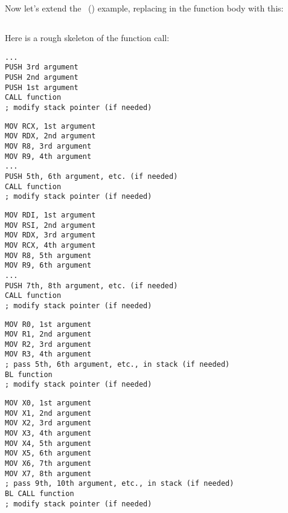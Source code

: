 \section{\PrintfSeveralArgumentsSectionName}

Now let's extend the \IT{\HelloWorldSectionName}~() example, replacing \printf in
the \main function body with this:







\subsection{\Conclusion{}}

Here is a rough skeleton of the function call:

\begin{lstlisting}[caption=x86]
...
PUSH 3rd argument
PUSH 2nd argument
PUSH 1st argument
CALL function
; modify stack pointer (if needed)
\end{lstlisting}

\begin{lstlisting}[caption=x64 (MSVC)]
MOV RCX, 1st argument
MOV RDX, 2nd argument
MOV R8, 3rd argument
MOV R9, 4th argument
...
PUSH 5th, 6th argument, etc. (if needed)
CALL function
; modify stack pointer (if needed)
\end{lstlisting}

\begin{lstlisting}[caption=x64 (GCC)]
MOV RDI, 1st argument
MOV RSI, 2nd argument
MOV RDX, 3rd argument
MOV RCX, 4th argument
MOV R8, 5th argument
MOV R9, 6th argument
...
PUSH 7th, 8th argument, etc. (if needed)
CALL function
; modify stack pointer (if needed)
\end{lstlisting}

\begin{lstlisting}[caption=ARM]
MOV R0, 1st argument
MOV R1, 2nd argument
MOV R2, 3rd argument
MOV R3, 4th argument
; pass 5th, 6th argument, etc., in stack (if needed)
BL function
; modify stack pointer (if needed)
\end{lstlisting}

\begin{lstlisting}[caption=ARM64]
MOV X0, 1st argument
MOV X1, 2nd argument
MOV X2, 3rd argument
MOV X3, 4th argument
MOV X4, 5th argument
MOV X5, 6th argument
MOV X6, 7th argument
MOV X7, 8th argument
; pass 9th, 10th argument, etc., in stack (if needed)
BL CALL function
; modify stack pointer (if needed)
\end{lstlisting}

